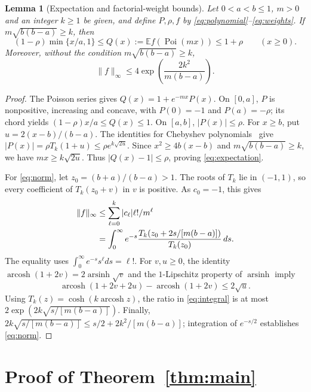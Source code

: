 \documentclass[10pt]{article}
\newtheorem{lemma}{Lemma}
\newcommand{\E}{\mathbb E}
\newcommand{\Poi}{\operatorname{Poi}}
\DeclareMathOperator{\arcosh}{arcosh}
\DeclareMathOperator{\arsinh}{arsinh}
\begin{document}
\begin{lemma}[Expectation and factorial-weight bounds]\label{lem:weights}
Let $0<a<b\le1$, $m>0$ and an integer $k\ge1$ be given, and define $P,\rho,f$ by
\eqref{eq:polynomial}--\eqref{eq:weights}. If $m\sqrt{b(b-a)}\ge k$, then
\begin{equation}
 (1-\rho)\min\{x/a,1\}
 \le Q(x):=\E f(\Poi(mx))\le1+\rho\qquad(x\ge0).
 \label{eq:expectation}
\end{equation}
Moreover, without the condition $m\sqrt{b(b-a)}\ge k$,
\begin{equation}
 \|f\|_\infty\le4\exp\!\left(\frac{2k^2}{m(b-a)}\right).
 \label{eq:norm}
\end{equation}
\end{lemma}
\begin{proof}
The Poisson series gives $Q(x)=1+e^{-mx}P(x)$. On $[0,a]$, $P$ is
nonpositive, increasing and concave, with $P(0)=-1$ and $P(a)=-\rho$;
its chord yields $(1-\rho)x/a\le Q(x)\le1$. On $[a,b]$, $|P(x)|\le\rho$.
For $x\ge b$, put $u=2(x-b)/(b-a)$. The identities for Chebyshev
polynomials~\cite[Section~18.5]{dlmf} give
$|P(x)|=\rho T_k(1+u)\le\rho e^{k\sqrt{2u}}$.
Since $x^2\ge4b(x-b)$ and $m\sqrt{b(b-a)}\ge k$, we have
$mx\ge k\sqrt{2u}$. Thus $|Q(x)-1|\le\rho$, proving
\eqref{eq:expectation}.

For \eqref{eq:norm}, let $z_0=(b+a)/(b-a)>1$. The roots of $T_k$ lie
in $(-1,1)$, so every coefficient of $T_k(z_0+v)$ in $v$ is positive.
As $c_0=-1$, this gives
\begin{align}
 \|f\|_\infty
 &\le \sum_{\ell=0}^k |c_\ell|\ell!/m^\ell\notag\\
 &=\int_0^\infty e^{-s}
 \frac{T_k(z_0+2s/[m(b-a)])}{T_k(z_0)}\,ds.
 \label{eq:integral}
\end{align}
The equality uses $\int_0^\infty e^{-s}s^\ell ds=\ell!$.
For $v,u\ge0$, the identity
$\arcosh(1+2v)=2\arsinh\sqrt v$ and the $1$-Lipschitz property of
$\arsinh$ imply
\[
 \arcosh(1+2v+2u)-\arcosh(1+2v)\le2\sqrt u.
\]
Using $T_k(z)=\cosh(k\arcosh z)$, the ratio in \eqref{eq:integral} is
at most $2\exp(2k\sqrt{s/[m(b-a)]})$. Finally,
$2k\sqrt{s/[m(b-a)]}\le s/2+2k^2/[m(b-a)]$; integration of $e^{-s/2}$
establishes \eqref{eq:norm}.
\end{proof}

\section{Proof of Theorem~\ref{thm:main}}
\end{document}
